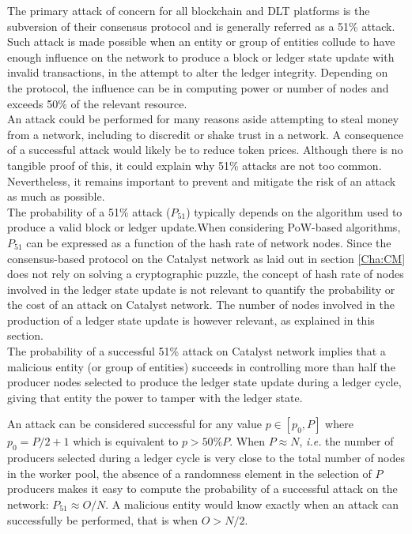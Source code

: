 The primary attack of concern for all blockchain and DLT platforms is the subversion of their consensus protocol and is generally referred as a 51\% attack. Such attack is made possible when an entity or group of entities collude to have enough influence on the network to produce a block or ledger state update with invalid transactions, in the attempt to alter the ledger integrity. Depending on the protocol, the influence can be in computing power or number of nodes and exceeds 50\% of the relevant resource.  \\

An attack could be performed for many reasons aside attempting to steal money from a network, including to discredit or shake trust in a network. A consequence of a successful attack would likely be to reduce token prices. Although there is no tangible proof of this, it could explain why 51\% attacks are not too common. Nevertheless, it remains important to prevent and mitigate the risk of an attack as much as possible.\\

The probability of a 51\% attack ($P_{51}$) typically depends on the algorithm used to produce a valid block or ledger update.When considering PoW-based algorithms, $P_{51}$ can be expressed as a function of the hash rate of network nodes.  Since the consensus-based protocol on the Catalyst network as laid out in section \ref{Cha:CM} does not rely on solving a cryptographic puzzle, the concept of hash rate of nodes involved in the ledger state update is not relevant to quantify the probability or the cost of an attack on Catalyst network. The number of nodes involved in the production of a ledger state update is however relevant, as explained in this section. \\ 

The probability of a successful 51\% attack on Catalyst network implies that a malicious entity (or group of entities) succeeds in controlling more than half the producer nodes selected to produce the ledger state update during a ledger cycle, giving that entity the power to tamper with the ledger state. 

An attack can be considered successful for any value $p \in [p_0,P]$ where $p_0 = P/2 + 1$ which is equivalent to $p > 50\%P$. When $P \approx N$, \textit{i.e.} the number of producers selected during a ledger cycle is very close to the total number of nodes in the worker pool, the absence of a randomness element in the selection of $P$ producers  makes it easy to compute the probability of a successful attack on the network: $P_{51} \approx O/N$. A malicious entity would know exactly when an attack can successfully be performed, that is when $O > N/2$. \\

